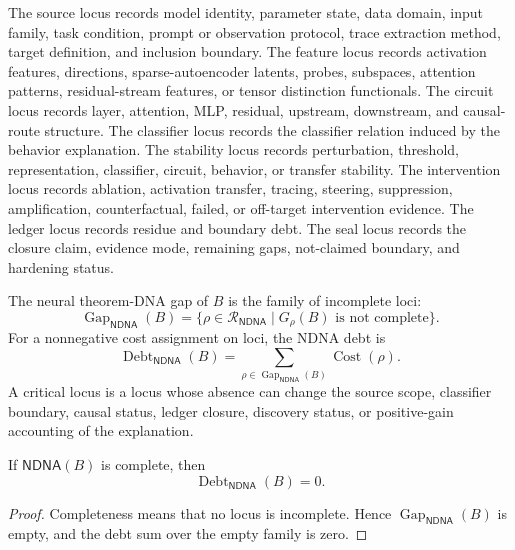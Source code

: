 \begin{definition}
\label{def:philosophy-neural-locus-content}
The source locus records model identity, parameter state, data domain,
input family, task condition, prompt or observation protocol, trace
extraction method, target definition, and inclusion boundary. The
feature locus records activation features, directions, sparse-autoencoder
latents, probes, subspaces, attention patterns, residual-stream features,
or tensor distinction functionals. The circuit locus records layer,
attention, MLP, residual, upstream, downstream, and causal-route
structure. The classifier locus records the classifier relation induced
by the behavior explanation. The stability locus records perturbation,
threshold, representation, classifier, circuit, behavior, or transfer
stability. The intervention locus records ablation, activation transfer, tracing,
steering, suppression, amplification, counterfactual, failed, or
off-target intervention evidence. The ledger locus records residue and
boundary debt. The seal locus records the closure claim, evidence mode,
remaining gaps, not-claimed boundary, and hardening status.
\end{definition}

\begin{definition}
\label{def:philosophy-ndna-gap-debt}
The neural theorem-DNA gap of $B$ is the family of incomplete loci:
$$
\operatorname{Gap}_{\mathsf{NDNA}}(B)
=
\{\rho\in\mathcal R_{\mathsf{NDNA}}
\mid
G_{\rho}(B)\text{ is not complete}\}.
$$
For a nonnegative cost assignment on loci, the NDNA debt is
$$
\operatorname{Debt}_{\mathsf{NDNA}}(B)
=
\sum_{\rho\in\operatorname{Gap}_{\mathsf{NDNA}}(B)}
\operatorname{Cost}(\rho).
$$
A critical locus is a locus whose absence can change the source scope,
classifier boundary, causal status, ledger closure, discovery status, or
positive-gain accounting of the explanation.
\end{definition}

\begin{theorem}
\label{thm:philosophy-complete-ndna-zero-debt}
If $\mathsf{NDNA}(B)$ is complete, then
$$
\operatorname{Debt}_{\mathsf{NDNA}}(B)=0.
$$
\end{theorem}
\begin{proof}
Completeness means that no locus is incomplete. Hence
$\operatorname{Gap}_{\mathsf{NDNA}}(B)$ is empty, and the debt sum over
the empty family is zero.
\end{proof}

